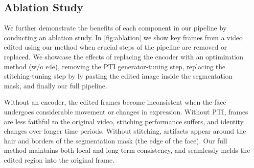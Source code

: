 

\subsection{Ablation Study}
\label{sec:ablation}

We further demonstrate the benefits of each component in our pipeline by conducting an ablation study. In \cref{fig:ablation} we show key frames from a video edited using our method when crucial steps of the pipeline are removed or replaced. We showcase the effects of replacing the encoder with an optimization method (w/o e4e), removing the PTI generator-tuning step, replacing the stitching-tuning step by {\naive}ly pasting the edited image inside the segmentation mask, and finally our full pipeline.

Without an encoder, the edited frames become inconsistent when the face undergoes considerable movement or changes in expression. Without PTI, frames are less faithful to the original video, stitching performance suffers, and identity changes over longer time periods.
Without stitching, artifacts appear around the hair and borders of the segmentation mask (\ie the edge of the face). Our full method maintains both local and long term consistency, and seamlessly melds the edited region into the original frame.


